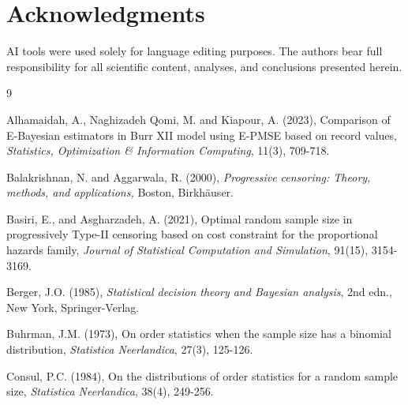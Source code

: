 \documentclass[twoside]{article}
\begin{document}
\section*{Acknowledgments}   
AI tools were used solely for language editing purposes. The authors bear full responsibility for all scientific content, analyses, and conclusions presented herein.
\begin{thebibliography}{9}


Alhamaidah, A., Naghizadeh Qomi, M. and  Kiapour, A. (2023), Comparison of E-Bayesian estimators in Burr XII model using E-PMSE based on record values, 
{\it Statistics, Optimization \& Information Computing},  {11}(3), 709-718.

Balakrishnan, N. and Aggarwala, R. (2000), {\it Progressive censoring: Theory, methods, and applications,}  Boston, Birkh\"auser.

Basiri, E., and Asgharzadeh, A. (2021), Optimal random sample size in progressively Type-II censoring based on cost constraint for the proportional hazards family, 
{\it Journal of Statistical Computation and Simulation},  {91}(15), 3154-3169.

Berger, J.O. (1985), {\it Statistical decision theory and Bayesian analysis}, 2nd edn., New York, Springer-Verlag.


Buhrman, J.M. (1973), On order statistics when the sample size has a binomial distribution, {\it Statistica Neerlandica}, { 27}(3), 125-126.


Consul, P.C. (1984), On the distributions of order statistics for a random sample size, {\it Statistica  Neerlandica}, {38}(4), 249-256.


\end{thebibliography}
\end{document}
